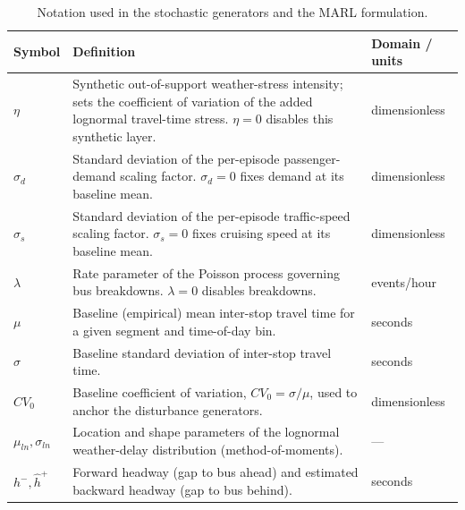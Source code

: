 \begin{table}[!t]
\centering
\caption{Notation used in the stochastic generators and the MARL formulation.}
\label{tab:notation}

\small
\renewcommand{\arraystretch}{1.25}

\begin{tabularx}{\textwidth}{
>{\RaggedRight\arraybackslash}p{}
>{\RaggedRight\arraybackslash}X
>{\RaggedRight\arraybackslash}p{}
}

\toprule
\textbf{Symbol} & \textbf{Definition} & \textbf{Domain / units} \\
\midrule

$\eta$ &
Synthetic out-of-support weather-stress intensity; sets the coefficient of variation of the added lognormal travel-time stress. $\eta=0$ disables this synthetic layer. &
dimensionless \\

$\sigma_d$ &
Standard deviation of the per-episode passenger-demand scaling factor. $\sigma_d=0$ fixes demand at its baseline mean. &
dimensionless \\

$\sigma_s$ &
Standard deviation of the per-episode traffic-speed scaling factor. $\sigma_s=0$ fixes cruising speed at its baseline mean. &
dimensionless \\

$\lambda$ &
Rate parameter of the Poisson process governing bus breakdowns. $\lambda=0$ disables breakdowns. &
events/hour \\

$\mu$ &
Baseline (empirical) mean inter-stop travel time for a given segment and time-of-day bin. &
seconds \\

$\sigma$ &
Baseline standard deviation of inter-stop travel time. &
seconds \\

$CV_0$ &
Baseline coefficient of variation, $CV_0=\sigma/\mu$, used to anchor the disturbance generators. &
dimensionless \\

$\mu_{ln},\sigma_{ln}$ &
Location and shape parameters of the lognormal weather-delay distribution (method-of-moments). &
--- \\

$h^-,\hat{h}^+$ &
Forward headway (gap to bus ahead) and estimated backward headway (gap to bus behind). &
seconds \\


\end{tabularx}
\end{table}
